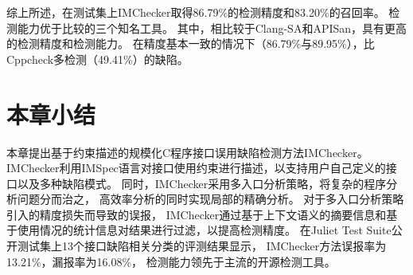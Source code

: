 综上所述，在测试集上IMChecker取得86.79\%的检测精度和83.20\%的召回率。
检测能力优于比较的三个知名工具。
其中，相比较于Clang-SA和APISan，具有更高的检测精度和检测能力。
在精度基本一致的情况下（86.79\%与89.95\%），比Cppcheck多检测（49.41\%）的缺陷。


\section{本章小结}
\label{sec:3.5}
本章提出基于约束描述的规模化C程序接口误用缺陷检测方法IMChecker。
IMChecker利用IMSpec语言对接口使用约束进行描述，以支持用户自己定义的接口以及多种缺陷模式。
同时，IMChecker采用多入口分析策略，将复杂的程序分析问题分而治之，
高效率分析的同时实现局部的精确分析。
对于多入口分析策略引入的精度损失而导致的误报，
IMChecker通过基于上下文语义的摘要信息和基于使用情况的统计信息对结果进行过滤，以提高检测精度。
在Juliet Test Suite公开测试集上13个接口缺陷相关分类的评测结果显示，
IMChecker方法误报率为13.21\%，漏报率为16.08\%，
检测能力领先于主流的开源检测工具。

